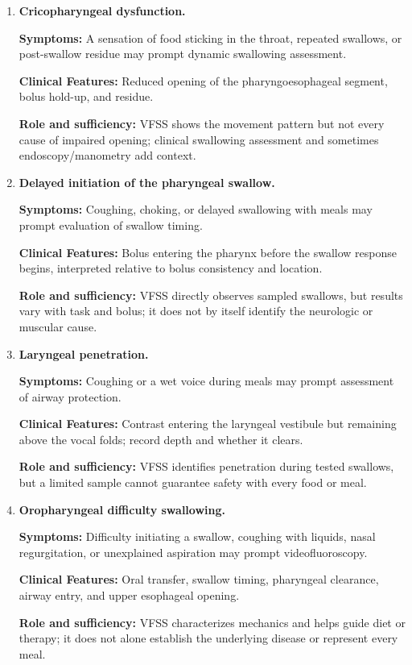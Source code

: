 \begin{enumerate}[leftmargin=*,itemsep=0.45em,topsep=0.4em]
\item \textbf{Cricopharyngeal dysfunction.}\par\noindent\textbf{Symptoms:} A sensation of food sticking in the throat, repeated swallows, or post-swallow residue may prompt dynamic swallowing assessment.\par\noindent\textbf{Clinical Features:} Reduced opening of the pharyngoesophageal segment, bolus hold-up, and residue.\par\noindent\textbf{Role and sufficiency:} VFSS shows the movement pattern but not every cause of impaired opening; clinical swallowing assessment and sometimes endoscopy/manometry add context.
\item \textbf{Delayed initiation of the pharyngeal swallow.}\par\noindent\textbf{Symptoms:} Coughing, choking, or delayed swallowing with meals may prompt evaluation of swallow timing.\par\noindent\textbf{Clinical Features:} Bolus entering the pharynx before the swallow response begins, interpreted relative to bolus consistency and location.\par\noindent\textbf{Role and sufficiency:} VFSS directly observes sampled swallows, but results vary with task and bolus; it does not by itself identify the neurologic or muscular cause.
\item \textbf{Laryngeal penetration.}\par\noindent\textbf{Symptoms:} Coughing or a wet voice during meals may prompt assessment of airway protection.\par\noindent\textbf{Clinical Features:} Contrast entering the laryngeal vestibule but remaining above the vocal folds; record depth and whether it clears.\par\noindent\textbf{Role and sufficiency:} VFSS identifies penetration during tested swallows, but a limited sample cannot guarantee safety with every food or meal.
\item \textbf{Oropharyngeal difficulty swallowing.}\par\noindent\textbf{Symptoms:} Difficulty initiating a swallow, coughing with liquids, nasal regurgitation, or unexplained aspiration may prompt videofluoroscopy.\par\noindent\textbf{Clinical Features:} Oral transfer, swallow timing, pharyngeal clearance, airway entry, and upper esophageal opening.\par\noindent\textbf{Role and sufficiency:} VFSS characterizes mechanics and helps guide diet or therapy; it does not alone establish the underlying disease or represent every meal.

\end{enumerate}
